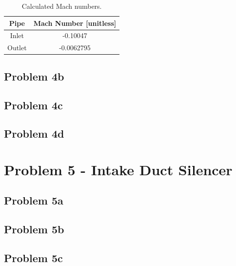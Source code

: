 {{\setlength{\abovecaptionskip}{0pt}
\vspace{0.1cm}
{\renewcommand{\arraystretch}{1.5}
\begin{table}[h!]
    \begin{center}
        \small
        \begin{tabular}{ | c | c | }
            \hline
            \textbf{Pipe}  &  \textbf{Mach Number [unitless]}  \\
            \hline
                Inlet  &  -0.10047  \\
                \hline
                \rowcolor{Gray}
                Outlet  &  -0.0062795  \\
            \hline
        \end{tabular}
    \end{center}
    \caption{Calculated Mach numbers.}
    \label{table:machNumbers}
\end{table}

\subsection*{Problem 4b}

\subsection*{Problem 4c}

\subsection*{Problem 4d}










\newpage
\section*{Problem 5 - Intake Duct Silencer}

\subsection*{Problem 5a}

\subsection*{Problem 5b}

\subsection*{Problem 5c}

}}}
